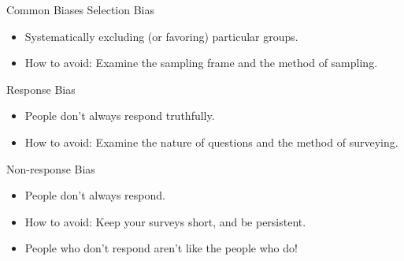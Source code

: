 \documentclass[aspectratio=169]{../latex_main/tntbeamer}  %
\begin{document}
	
	\begin{frame}{Common Biases}
	    Selection Bias
        \begin{itemize}
            \item Systematically excluding (or favoring) particular groups.
            \item How to avoid: Examine the sampling frame and the method of sampling.
        \end{itemize}
        Response Bias
        \begin{itemize}
            \item People don’t always respond truthfully.
            \item How to avoid: Examine the nature of questions and the method of surveying.
        \end{itemize}
        Non-response Bias
        \begin{itemize}
            \item People don’t always respond.
            \item How to avoid: Keep your surveys short, and be persistent.
            \item People who don’t respond aren’t like the people who do!
        \end{itemize}
	\end{frame}
	
\end{document}
